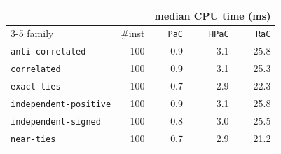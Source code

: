 \begin{tabular}{@{}lrrrr@{}}
\toprule
 &  & \multicolumn{3}{c}{median CPU time (ms)} \\
\cmidrule(l){3-5}
family & \#inst & \texttt{PaC} & \texttt{HPaC} & \texttt{RaC} \\
\midrule
\texttt{anti-correlated} & 100 & 0.9 & 3.1 & 25.8 \\
\texttt{correlated} & 100 & 0.9 & 3.1 & 25.3 \\
\texttt{exact-ties} & 100 & 0.7 & 2.9 & 22.3 \\
\texttt{independent-positive} & 100 & 0.9 & 3.1 & 25.8 \\
\texttt{independent-signed} & 100 & 0.8 & 3.0 & 25.5 \\
\texttt{near-ties} & 100 & 0.7 & 2.9 & 21.2 \\
\bottomrule
\end{tabular}
